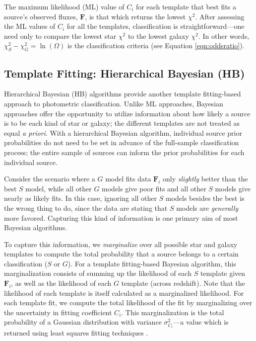 \documentclass[12pt,preprint]{aastex}
\newcommand{\datavector}[1]{\boldsymbol{#1}}
\begin{document}
The maximum likelihood (ML) value of $C_i$ for each template that best
fits a source's observed fluxes, $\datavector{F}$, is that which
returns the lowest $\chi^2$. After assessing the ML values of $C_i$
for all the templates, classification is straightforward---one need
only to compare the lowest star $\chi^2$ to the lowest galaxy
$\chi^2$.  In other words, $\chi^2_S-\chi^2_G=\ln(\Omega)$ is the
classification criteria (see Equation \ref{eqn:oddsratio}).

\subsection{Template Fitting: Hierarchical Bayesian (HB)}
\label{ssec:HBmethod}

Hierarchical Bayesian (HB) algorithms provide another template
fitting-based approach to photometric classification.  Unlike ML
approaches, Bayesian approaches offer the opportunity to utilize
information about how likely a source is to be each kind of star or
galaxy; the different templates are not treated as equal \emph{a
priori}.  With a hierarchical Bayesian algorithm, individual source
prior probabilities do not need to be set in advance of the
full-sample classification process; the entire sample of sources can
inform the prior probabilities for each individual source.

Consider the scenario where a $G$ model fits data $\datavector{F}_i$
only \textit{slightly} better than the best $S$ model, while all other
$G$ models give poor fits and all other $S$ models give nearly as
likely fits.  In this case, ignoring all other $S$ models besides the
best is the wrong thing to do, since the data are stating that $S$
models are \textit{generally} more favored.  Capturing this kind of
information is one primary aim of most Bayesian algorithms.

To capture this information, we \textit{marginalize} over all possible
star and galaxy templates to compute the total probability that a
source belongs to a certain classification ($S$ or $G$).  For a
template fitting-based Bayesian algorithm, this marginalization
consists of summing up the likelihood of each $S$ template given
$\datavector{F}_i$, as well as the likelihood of each $G$ template
(across redshift).  Note that the likelihood of each template is itself
calculated as a marginalized likelihood.  For each template fit, we
compute the total likelihood of the fit by marginalizing over the
uncertainty in fitting coefficient $C_i$.  This marginalization is the
total probability of a Gaussian distribution with variance
$\sigma_{C_i}^2$---a value which is returned using least squares
fitting techniques \citep[e.g.,][]{hogg10a}.
\end{document}
